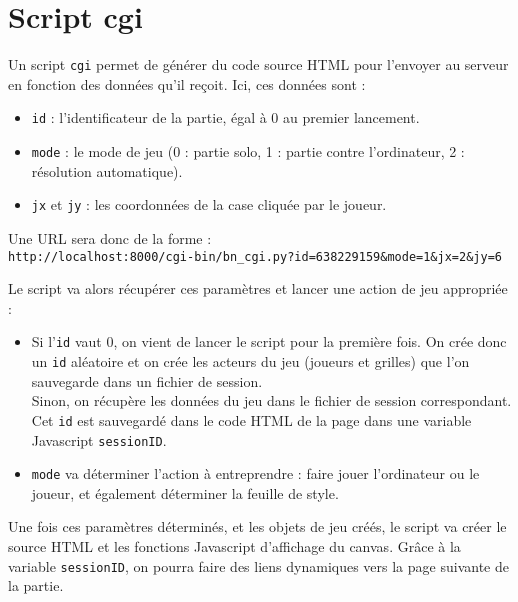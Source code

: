 \section{Script cgi}
Un script \texttt{cgi} permet de générer du code source HTML pour l'envoyer au serveur en fonction des données qu'il reçoit. Ici, ces données sont :
\begin{itemize}
\item \texttt{id} : l'identificateur de la partie, égal à 0 au premier lancement.
\item \texttt{mode} : le mode de jeu (0 : partie solo, 1 : partie contre l'ordinateur, 2 : résolution automatique).
\item \texttt{jx} et \texttt{jy} : les coordonnées de la case cliquée par le joueur. 
\end{itemize}
Une URL sera donc de la forme :\\
\texttt{http://localhost:8000/cgi-bin/bn\_cgi.py?id=638229159\&mode=1\&jx=2\&jy=6}

Le script va alors récupérer ces paramètres et lancer une action de jeu appropriée : 
\begin{itemize}
\item Si l'\texttt{id} vaut 0, on vient de lancer le script pour la première fois. On crée donc un \texttt{id} aléatoire et on crée les acteurs du jeu (joueurs et grilles) que l'on sauvegarde dans un fichier de session.\\
Sinon, on récupère les données du jeu dans le fichier de session correspondant.\\
Cet \texttt{id} est sauvegardé dans le code HTML de la page dans une variable Javascript \texttt{sessionID}.
\item \texttt{mode} va déterminer l'action à entreprendre : faire jouer l'ordinateur ou le joueur, et également déterminer la feuille de style.
\end{itemize}

Une fois ces paramètres déterminés, et les objets de jeu créés, le script va créer le source HTML et les fonctions Javascript d'affichage du canvas. Grâce à la variable \texttt{sessionID}, on pourra faire des liens dynamiques vers la page suivante de la partie. 